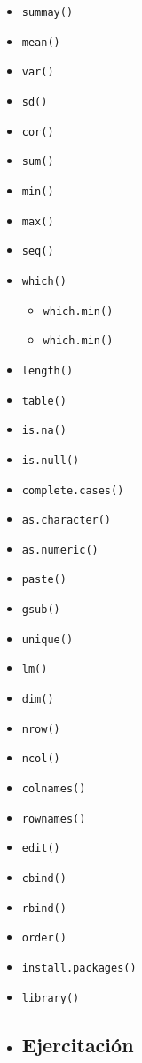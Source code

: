 \documentclass[
]{book}
\providecommand{\tightlist}{%
  \setlength{\itemsep}{0pt}\setlength{\parskip}{0pt}}
\newenvironment{rmdblock}[1]
{\begin{shaded*}
		\begin{itemize}
			\renewcommand{\labelitemi}{
				\raisebox{-.7\height}[0pt][0pt]{
					{\setkeys{Gin}{width=3em,keepaspectratio}\texttt{[image: images/\#1]}}
				}
			}
			\item
		}
		{
		\end{itemize}
	\end{shaded*}
}
\newenvironment{rmdtip}
{\begin{rmdblock}{tip}}
	{\end{rmdblock}}
\begin{document}
\begin{itemize}
\tightlist
\item
  \texttt{summay()}
\item
  \texttt{mean()}
\item
  \texttt{var()}
\item
  \texttt{sd()}
\item
  \texttt{cor()}
\item
  \texttt{sum()}
\item
  \texttt{min()}
\item
  \texttt{max()}
\item
  \texttt{seq()}
\item
  \texttt{which()}

  \begin{itemize}
  \tightlist
  \item
    \texttt{which.min()}
  \item
    \texttt{which.min()}
  \end{itemize}
\item
  \texttt{length()}
\item
  \texttt{table()}
\item
  \texttt{is.na()}
\item
  \texttt{is.null()}
\item
  \texttt{complete.cases()}
\item
  \texttt{as.character()}
\item
  \texttt{as.numeric()}
\item
  \texttt{paste()}
\item
  \texttt{gsub()}
\item
  \texttt{unique()}
\item
  \texttt{lm()}
\item
  \texttt{dim()}
\item
  \texttt{nrow()}
\item
  \texttt{ncol()}
\item
  \texttt{colnames()}
\item
  \texttt{rownames()}
\item
  \texttt{edit()}
\item
  \texttt{cbind()}
\item
  \texttt{rbind()}
\item
  \texttt{order()}
\item
  \texttt{install.packages()}
\item
  \texttt{library()}
\end{itemize}

\begin{rmdtip}
\hypertarget{ejercicio-objetos}{%
\subsection{Ejercitación}\label{ejercicio-objetos}}
\end{rmdtip}
\end{document}

